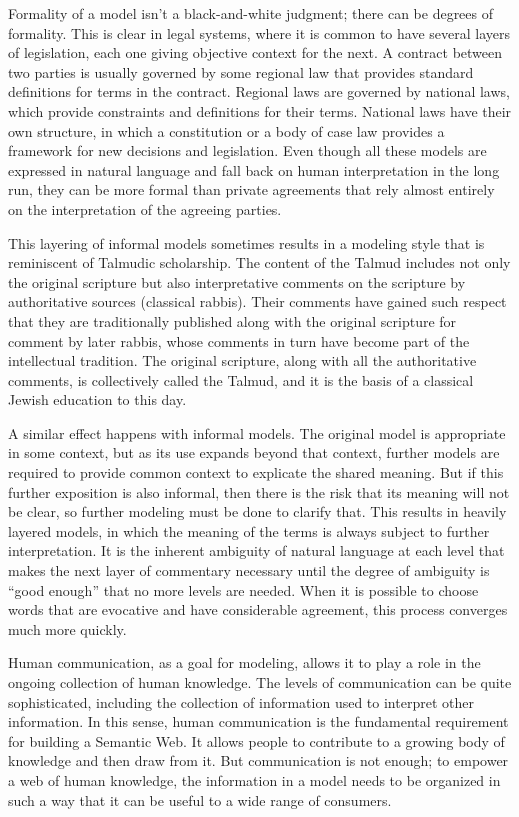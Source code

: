Formality of a model isn't a black-and-white judgment; there can be
degrees of formality. This is clear in legal systems, where it is common
to have several layers of legislation, each one giving objective context
for the next. A contract between two parties is usually governed by some
regional law that provides standard definitions for terms in the
contract. Regional laws are governed by national laws, which provide
constraints and definitions for their terms. National laws have their
own structure, in which a constitution or a body of case law provides a
framework for new decisions and legislation. Even though all these
models are expressed in natural language and fall back on human
interpretation in the long run, they can be more formal than private
agreements that rely almost entirely on the interpretation of the
agreeing parties.

This layering of informal models sometimes results in a modeling style
that is reminiscent of Talmudic scholarship. The content of the Talmud
includes not only the original scripture but also interpretative
comments on the scripture by authoritative sources (classical rabbis).
Their comments have gained such respect that they are traditionally
published along with the original scripture for comment by later rabbis,
whose comments in turn have become part of the intellectual tradition.
The original scripture, along with all the authoritative comments, is
collectively called the Talmud, and it is the basis of a classical
Jewish education to this day.

A similar effect happens with informal models. The original model is
appropriate in some context, but as its use expands beyond that context,
further models are required to provide common context to explicate the
shared meaning. But if this further exposition is also informal, then
there is the risk that its meaning will not be clear, so further
modeling must be done to clarify that. This results in heavily layered
models, in which the meaning of the terms is always subject to further
interpretation. It is the inherent ambiguity of natural language at each
level that makes the next layer of commentary necessary until the degree
of ambiguity is ``good enough'' that no more levels are needed. When it
is possible to choose words that are evocative and have considerable
agreement, this process converges much more quickly.

Human communication, as a goal for modeling, allows it to play a role in
the ongoing collection of human knowledge. The levels of communication
can be quite sophisticated, including the collection of information used
to interpret other information. In this sense, human communication is
the fundamental requirement for building a Semantic Web. It allows
people to contribute to a growing body of knowledge and then draw from
it. But communication is not enough; to empower a web of human
knowledge, the information in a model needs to be organized in such a
way that it can be useful to a wide range of consumers.

